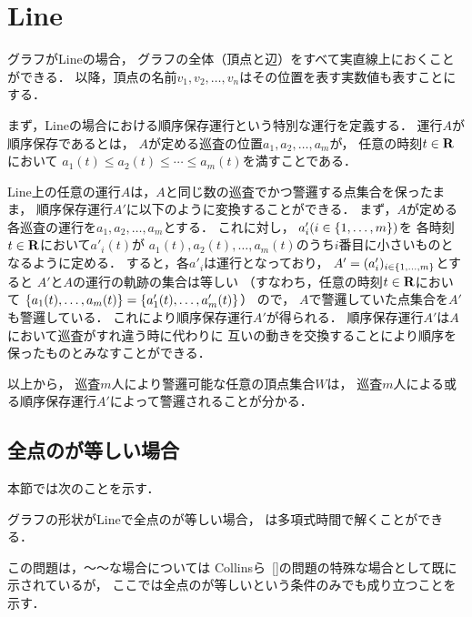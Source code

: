 
\section{Line}
\label{section: line}

グラフがLineの場合，
グラフの全体（頂点と辺）をすべて実直線上におくことができる．
以降，頂点の名前$v_1, v_2, \ldots, v_n$はその位置を表す実数値も表すことにする．

まず，Lineの場合における順序保存運行という特別な運行を定義する．
運行$A$が順序保存であるとは，
$A$が定める巡査の位置$a_1, a_2, \ldots, a_m$が，
任意の時刻$t \in \mathbf R$において
$a_1(t) \leq a_2(t) \leq \cdots \leq a_m(t)$を満すことである．

Line上の任意の運行$A$は，$A$と同じ数の巡査でかつ警邏する点集合を保ったまま，
順序保存運行$A'$に以下のように変換することができる．
%
まず，$A$が定める各巡査の運行を$a_1, a_2, \ldots, a_m$とする．
これに対し，
$a'_i (i \in \left\{{1, \ldots, m}\right\})$を
各時刻$t \in \mathbf R$において$a' _i(t)$が
$a_1(t), a_2(t), \ldots, a_m(t)$のうち$i$番目に小さいものとなるように定める．
すると，各$a' _i$は運行となっており，
$A' = (a' _i)_{ i \in \left\{{1,\ldots, m}\right\} }$とすると
$A'$と$A$の運行の軌跡の集合は等しい
（すなわち，任意の時刻$t \in \mathbf R$において
$\left\{{a_1(t), \ldots, a_m(t)}\right\} = \left\{{a'_1(t), \ldots, a'_m(t)}\right\}$）
ので，
$A$で警邏していた点集合を$A'$も警邏している．
これにより順序保存運行$A'$が得られる．
%
順序保存運行$A'$は$A$において巡査がすれ違う時に代わりに
互いの動きを交換することにより順序を保ったものとみなすことができる．

以上から，
巡査$m$人により警邏可能な任意の頂点集合$W$は，
巡査$m$人による或る順序保存運行$A'$によって警邏されることが分かる．





\subsection{全点の{\idletime}が等しい場合}
\label{subsec:LineUnaryTimelimit}




本節では次のことを示す．

\begin{theo}
  \label{theo:LineEqualTimelimit}
  グラフの形状がLineで全点の{\idletime}が等しい場合，
  {\patrolling}は多項式時間で解くことができる．
\end{theo}

この問題は，～～な場合については Collinsら~\ref{}の問題の特殊な場合として既に示されているが，
ここでは全点の{\idletime}が等しいという条件のみでも成り立つことを示す．


